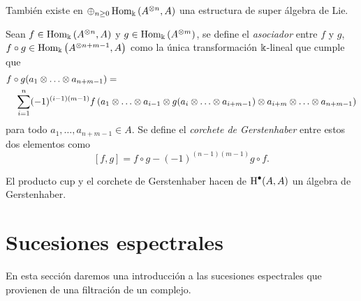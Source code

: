 \documentclass[a4paper,oneside,fleqn,11pt,../tesis.tex]{subfiles}
\begin{document}
También existe en $\oplus_{n \geq 0}\operatorname{Hom}_{\Bbbk}\left(A^{\otimes n}, A\right)$ una estructura de super álgebra de Lie.
\begin{definition}
Sean $f \in \operatorname{Hom}_{\Bbbk}\left(A^{\otimes n}, A\right)$ y $g \in \operatorname{Hom}_{\Bbbk}\left(A^{\otimes m}\right)$, se define el \emph{asociador}
entre $f$ y $g$, $f \circ g \in \operatorname{Hom}_{\Bbbk}\left(A^{\otimes n + m - 1}, A\right)$ como la única transformación $\Bbbk$-lineal que cumple que
	\begin{align*}
		&f \circ g (a_1\otimes \ldots \otimes a_{n + m - 1 }) = \\
		&\quad\sum_{i = 1}^n (-1)^{(i - 1)(m -1)}
				f\left(a_1\otimes \ldots \otimes a_{i - 1} \otimes g(a_{i} \otimes \ldots \otimes a_{i + m - 1}) \otimes a_{i + m} \otimes \ldots \otimes a_{n + m - 1}\right)
	\end{align*}
	para todo $a_1, \ldots, a_{n + m - 1} \in A$.
Se define el \emph{corchete de Gerstenhaber} entre estos dos elementos como
\[
	\left[f, g\right] = f \circ g  - (-1)^{(n -1)(m -1)}g \circ f.
\] 
\end{definition}

El producto cup y el corchete de Gerstenhaber hacen de $\operatorname{H}^{\bullet}(A, A)$ un álgebra de Gerstenhaber.

\section{Sucesiones espectrales}\label{sucesiones_espectrales}

En esta sección daremos una introducción a las sucesiones espectrales que provienen de una filtración de un complejo.
\end{document}
